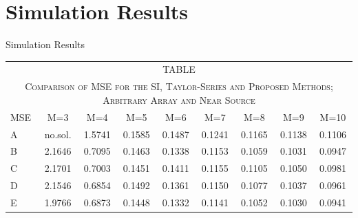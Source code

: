 \documentclass[10pt]{beamer}
\begin{document}

\section{Simulation Results}

\begin{frame}{Simulation Results}
  \begin{center}
  \begin{tabular}{l c c c c c c c c}\\
  \multicolumn{9}{c}{TABLE \uppercase\expandafter{\romannumeral1}}\\
  \multicolumn{9}{c}{\textsc{\tiny Comparison of MSE for the SI, Taylor-Series and Proposed Methods; Arbitrary Array and Near Source}}\\\hline
  \scriptsize MSE  &  \scriptsize  M=3     &  \scriptsize  M=4    &  \scriptsize M=5    &  \scriptsize  M=6    &  \scriptsize  M=7    &  \scriptsize M=8    &  \scriptsize M=9     &  \scriptsize M=10     \\\hline
  \scriptsize A    &  \scriptsize no.sol.  &  \scriptsize  1.5741 &  \scriptsize 0.1585 &  \scriptsize  0.1487 &  \scriptsize  0.1241 &  \scriptsize 0.1165 &  \scriptsize 0.1138  &  \scriptsize 0.1106   \\
  \scriptsize B    &  \scriptsize 2.1646   &  \scriptsize  0.7095 &  \scriptsize 0.1463 &  \scriptsize  0.1338 &  \scriptsize  0.1153 &  \scriptsize 0.1059 &  \scriptsize 0.1031  &  \scriptsize 0.0947   \\
  \scriptsize C    &  \scriptsize 2.1701   &  \scriptsize  0.7003 &  \scriptsize 0.1451 &  \scriptsize  0.1411 &  \scriptsize  0.1155 &  \scriptsize 0.1105 &  \scriptsize 0.1050  &  \scriptsize 0.0981   \\
  \scriptsize D    &  \scriptsize 2.1546   &  \scriptsize  0.6854 &  \scriptsize 0.1492 &  \scriptsize  0.1361 &  \scriptsize  0.1150 &  \scriptsize 0.1077 &  \scriptsize 0.1037  &  \scriptsize 0.0961   \\
  \scriptsize E    &  \scriptsize 1.9766   &  \scriptsize  0.6873 &  \scriptsize 0.1448 &  \scriptsize  0.1332 &  \scriptsize  0.1141 &  \scriptsize 0.1052 &  \scriptsize 0.1030  &  \scriptsize 0.0941   \\\hline

\end{tabular}
\end{center}
\end{frame}
\end{document}
